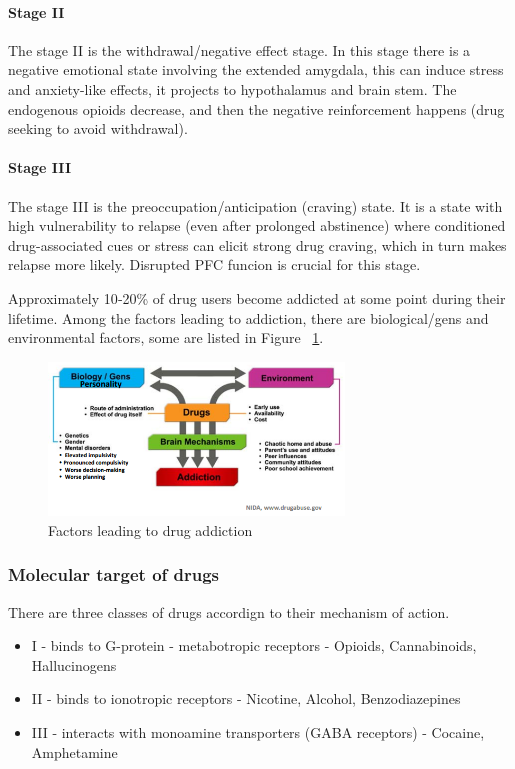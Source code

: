 \documentclass[12pt,article,oneside,a4paper]{memoir}
\begin{document}
\paragraph{Stage II}
The stage II is the withdrawal/negative effect stage. In this stage there is a negative emotional state involving the extended amygdala, this can induce stress and anxiety-like effects, it projects to hypothalamus and brain stem. The endogenous opioids decrease, and then the negative reinforcement happens (drug seeking to avoid withdrawal).

\paragraph{Stage III}
The stage III is the preoccupation/anticipation (craving) state. It is a state with high vulnerability to relapse (even after prolonged abstinence) where conditioned drug-associated cues or stress can elicit strong drug craving, which in turn makes relapse more likely. Disrupted PFC funcion is crucial for this stage.

Approximately 10‐20\% of drug users become addicted at some point during their lifetime. Among the factors leading to addiction, there are biological/gens and environmental factors, some are listed in Figure ~\ref{fig:drug-addiction-factors}.

\begin{figure}
  \centering
  \includegraphics[width=0.7\textwidth]{imgs/drug-addiction-factors.png}
  \caption{Factors leading to drug addiction}
  \label{fig:drug-addiction-factors}
\end{figure}

\subsubsection{Molecular target of drugs}
There are three classes of drugs accordign to their mechanism of action.

\begin{itemize}
\item I - binds to G-protein - metabotropic receptors - Opioids, Cannabinoids, Hallucinogens
\item II - binds to ionotropic receptors - Nicotine, Alcohol, Benzodiazepines
\item III - interacts with monoamine transporters (GABA receptors) - Cocaine, Amphetamine
\end{itemize}
\end{document}
